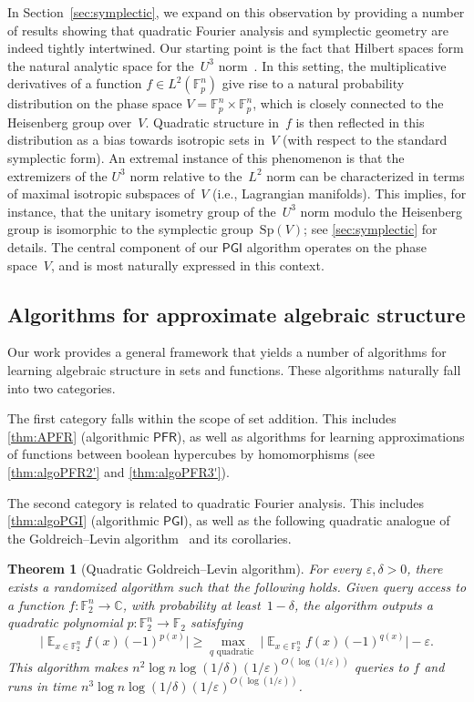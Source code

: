 \documentclass[11pt]{amsart}
\newcommand{\Exp}{\mathop{\mathbb{E}}}
\newcommand{\C}{\mathbb{C}} %
\newcommand{\F}{\mathbb{F}} %
\newcommand{\PFR}{\textsf{PFR}}
\newcommand{\PGI}{\textsf{PGI}}
\newcommand{\Sp}{\mathrm{Sp}}
\newcommand{\eps}{\varepsilon}
\theoremstyle{plain}
\newtheorem{theorem}{Theorem}[section]
\theoremstyle{definition}
\theoremstyle{remark}
\begin{document}
In Section~\ref{sec:symplectic}, we expand on this observation by providing a number of results showing that quadratic Fourier analysis and symplectic geometry are indeed tightly intertwined.
Our starting point is the fact that Hilbert spaces form the natural analytic space for the~$U^3$ norm~\cite{eisner2012large}.
In this setting, the multiplicative derivatives of a function $f\in L^2(\F_p^n)$ give rise to a natural probability distribution on the phase space $V = \F_p^n \times \F_p^n$, which is closely connected to the Heisenberg group over~$V$.
Quadratic structure in~$f$ is then reflected in this distribution as a bias towards isotropic sets in~$V$ (with respect to the standard symplectic form).
An extremal instance of this phenomenon is that the extremizers of the $U^3$ norm relative to the~$L^2$ norm can be characterized in terms of maximal isotropic subspaces of~$V$ (i.e., Lagrangian manifolds).
This implies, for instance, that the unitary isometry group of the~$U^3$ norm modulo the Heisenberg group is isomorphic to the symplectic group~$\Sp(V)$;
see \cref{sec:symplectic} for details.
The central component of our $\PGI$ algorithm operates on the phase space~$V$, and is most naturally expressed in this context.


\subsection{Algorithms for approximate algebraic structure}
Our work provides a general framework that yields a number of  algorithms for learning algebraic structure in sets and functions.
These algorithms naturally fall into two categories.

The first category falls within the scope of set addition.
This includes \cref{thm:APFR} (algorithmic $\PFR$), as well as algorithms for learning approximations of functions between boolean hypercubes by homomorphisms (see \cref{thm:algoPFR2'} and \cref{thm:algoPFR3'}).

The second category is related to quadratic Fourier analysis. This includes \cref{thm:algoPGI} (algorithmic $\PGI$), as well as the following quadratic analogue of the Goldreich--Levin algorithm~\cite{GoldreichLevin1989} and its corollaries.

\begin{theorem}[Quadratic Goldreich--Levin algorithm] \label{thm:quadratic_GL}
For every $\eps,\delta>0$, there exists a randomized algorithm such that the following holds.
Given query access to a function $f: \F_2^n \rightarrow \C$, with probability at least~$1 - \delta$, the algorithm outputs a quadratic polynomial $p: \F_2^n \rightarrow \F_2$ satisfying
$$\big|\Exp_{x \in \F_2^n} f(x) (-1)^{p(x)}\big| \geq \max_{q \text{ quadratic }} \big|\Exp_{x \in \F_2^n} f(x) (-1)^{q(x)}\big| - \eps.$$
This algorithm makes $n^2 \log n \log(1/\delta) (1/\varepsilon)^{O(\log(1/\varepsilon))}$ queries to $f$ and runs in time $n^3 \log n \log(1/\delta) (1/\varepsilon)^{O(\log(1/\varepsilon))}$.
\end{theorem}
\end{document}
